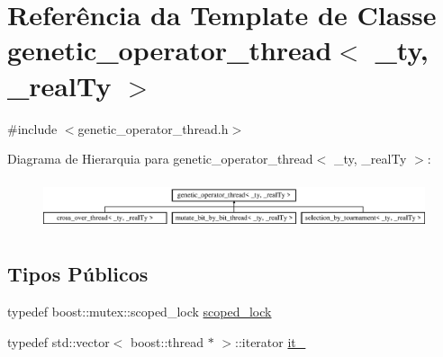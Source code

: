 \hypertarget{classgenetic__operator__thread}{
\section{Referência da Template de Classe genetic\_\-operator\_\-thread$<$ \_\-ty, \_\-realTy $>$}
\label{classgenetic__operator__thread}
}


{\ttfamily \#include $<$genetic\_\-operator\_\-thread.h$>$}

Diagrama de Hierarquia para genetic\_\-operator\_\-thread$<$ \_\-ty, \_\-realTy $>$:\begin{figure}[H]
\begin{center}
\leavevmode
\includegraphics[height=1.47563cm]{classgenetic__operator__thread}
\end{center}
\end{figure}
\subsection*{Tipos Públicos}
\begin{DoxyCompactItemize}
\item 
typedef boost::mutex::scoped\_\-lock \hyperlink{classgenetic__operator__thread_abe926f8fc2a1548516dad216a1acd4fb}{scoped\_\-lock}
\item 
typedef std::vector$<$ boost::thread $\ast$ $>$::iterator \hyperlink{classgenetic__operator__thread_ac5a153e12dd6711746126c48edba271a}{it\_\-}
\end{DoxyCompactItemize}
